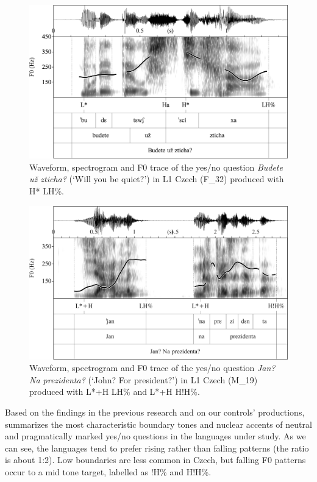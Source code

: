 \begin{figure}[H]
\includegraphics[width=\textwidth]{figures/Figure_4.67.png}
\caption{Waveform, spectrogram and F0 trace of the yes/no question \textit{Budete už zticha?} (‘Will you be quiet?’)  in L1 Czech (F\_32) produced with H* LH\%.}
\label{fig:4.67}
\end{figure}

\begin{figure}[H]
\includegraphics[width=\textwidth]{figures/Figure_4.68.png}
\caption{Waveform, spectrogram and F0 trace of the yes/no question \textit{Jan? Na prezidenta?} (‘John? For president?’) in L1 Czech (M\_19) produced with L*+H LH\% and L*+H H!H\%.}
\label{fig:4.68}
\end{figure}

Based on the findings in the previous research and on our controls’ productions,  summarizes the most characteristic boundary tones and nuclear accents of neutral and pragmatically marked yes/no questions in the languages under study. As we can see, the languages tend to prefer rising rather than falling patterns (the ratio is about 1:2). Low boundaries are less common in Czech, but falling F0 patterns occur to a mid tone target, labelled as !H\% and H!H\%.

